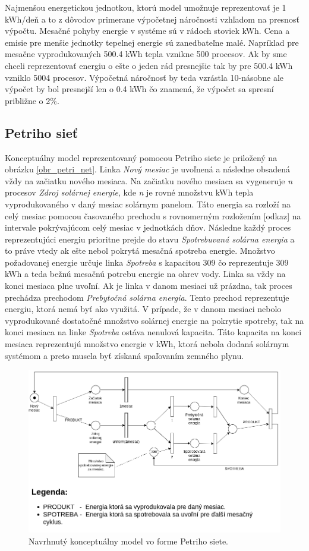\documentclass[a4paper, 11pt]{article}
\begin{document}
Najmenšou energetickou jednotkou, ktorú model umožnuje reprezentovať je 1 kWh/deň a to z dôvodov primerane výpočetnej náročnosti vzhľadom na presnosť výpočtu. Mesačné pohyby energie v systéme sú v rádoch stoviek kWh. Cena a emisie pre menšie jednotky tepelnej energie sú zanedbateľne malé. Napríklad pre mesačne vyprodukovaných 500.4 kWh tepla vznikne 500 procesov. Ak by sme chceli reprezentovať energiu o ešte o jeden rád presnejšie tak by pre 500.4 kWh vzniklo 5004 procesov. Výpočetná náročnosť by teda vzrástla 10-násobne ale výpočet by bol presnejší len o 0.4 kWh čo znamená, že výpočet sa spresní približne o 2\%.


\subsection{Petriho sieť}
Konceptuálny model reprezentovaný pomocou Petriho siete je priložený na obrázku \ref{obr_petri_net}. Linka \textit{Nový mesiac} je uvoľnená a následne obsadená vždy na začiatku nového mesiaca. Na začiatku nového mesiaca sa vygeneruje \textit{n} procesov \textit{Zdroj solárnej energie}, kde \textit{n} je rovné množstvu kWh tepla vyprodukovaného v daný mesiac solárnym panelom. Táto energia sa rozloží na celý mesiac pomocou časovaného prechodu s rovnomerným rozložením [odkaz] na intervale pokrývajúcom celý mesiac v jednotkách dňov. Následne každý proces reprezentujúci energiu prioritne prejde do stavu \textit{Spotrebuvaná solárna energia} a to práve vtedy ak ešte nebol pokrytá mesačná spotreba energie. Množstvo požadovanej energie určuje linka \textit{Spotreba} s kapacitou 309 čo reprezentuje 309 kWh a teda bežnú mesačnú potrebu energie na ohrev vody. Linka sa vždy na konci mesiaca plne uvoľní. Ak je linka v danom mesiaci už prázdna, tak proces prechádza prechodom \textit{Prebytočná solárna energia}. Tento prechod reprezentuje energiu, ktorá nemá byť ako využitá. V prípade, že v danom mesiaci nebolo vyprodukované dostatočné množstvo solárnej energie na pokrytie spotreby, tak na konci mesiaca na linke \textit{Spotreba} ostáva nenulová kapacita. Táto kapacita na konci mesiaca reprezentujú množstvo energie v kWh, ktorá nebola dodaná solárnym systémom a preto musela byť získaná spaľovaním zemného plynu.


\begin{figure}[h] 
	\centering
	\includegraphics[width=.8\paperwidth]{petri_net.png}
	\caption{Navrhnutý konceptuálny model vo forme Petriho siete.}
	\label{obr1}
\end{figure} \label{obr_petri_net}

\newpage


\end{document}
